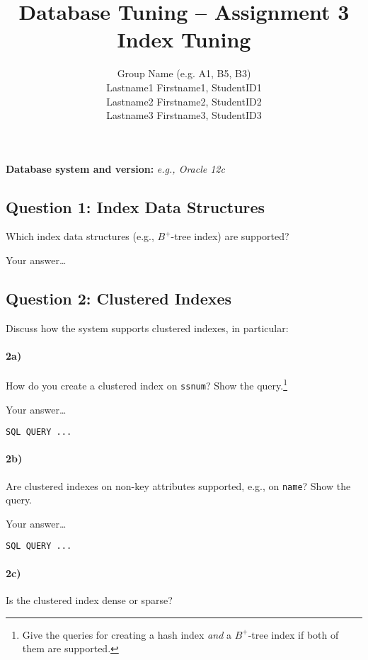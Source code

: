\documentclass[11pt]{scrartcl}
\title{
  \textbf{\large Database Tuning -- Assignment 3}\\
  Index Tuning
}
\author{
 Group Name (e.g. A1, B5, B3)\\
 \large Lastname1 Firstname1, StudentID1 \\
 \large Lastname2 Firstname2, StudentID2 \\
 \large Lastname3 Firstname3, StudentID3 
}
\begin{document}
\maketitle

\medskip

\noindent\textbf{Database system and version:} {\it e.g., Oracle 12c}

\subsection*{Question 1: Index Data Structures} Which index data structures (e.g., $B^+$-tree
index) are supported?

\smallskip

Your answer\dots

\subsection*{Question 2: Clustered Indexes} Discuss how the system
supports clustered indexes, in particular:

\paragraph{2a)} How do you create a clustered index on {\tt ssnum}?
Show the query.\footnote{Give the queries for creating a hash index
  \emph{and} a $B^+$-tree index if both of them are supported.}

\smallskip

Your answer\dots

{\small
\begin{verbatim}
SQL QUERY ...
\end{verbatim}
}

\paragraph{2b)} Are clustered indexes on non-key attributes supported, e.g.,
on {\tt name}?  Show the query.

\smallskip

Your answer\dots

{\small
\begin{verbatim}
SQL QUERY ...
\end{verbatim}
}

\paragraph{2c)} Is the clustered index dense or sparse?
\end{document}
